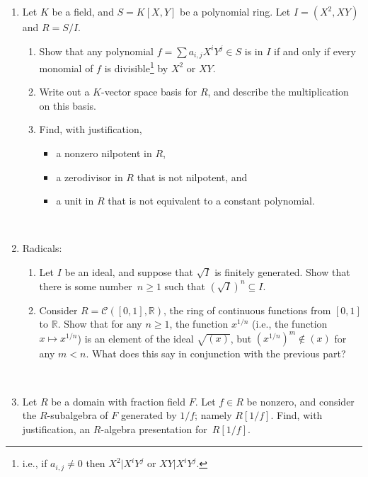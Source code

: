 \documentclass[12pt]{amsart}
\newcommand{\R}{\mathbb{R}}
\begin{document}
	
\begin{enumerate}
\item Let $K$ be a field, and $S=K[X,Y]$ be a polynomial ring. Let $I=(X^2,XY)$ and $R=S/I$.
\begin{enumerate}
\item Show that any polynomial $f=\sum a_{i,j} X^i Y^j \in S$ is in $I$ if and only if every monomial of $f$ is divisible\footnote{i.e., if $a_{i,j}\neq 0$ then $X^2 | X^i Y^j$ or $XY | X^i Y^j$.}
 by $X^2$ or $XY$.
\item Write out a $K$-vector space basis for $R$, and describe the multiplication on this basis.
\item Find, with justification,
\begin{itemize}
\item a nonzero nilpotent in $R$,
\item a zerodivisor in $R$ that is not nilpotent, and
\item a unit in $R$ that is not equivalent to a constant polynomial.
\end{itemize}
\end{enumerate}


\


\item Radicals:
\begin{enumerate}
\item Let $I$ be an ideal, and suppose that $\sqrt{I}$ is finitely generated. Show that there is some number~$n\geq 1$ such that $(\sqrt{I})^n \subseteq I$.
\item Consider $R=\mathcal{C}([0,1],\R)$, the ring of continuous functions from $[0,1]$ to $\R$. Show that for any $n\geq 1$, the function $x^{1/n}$ (i.e., the function $x\mapsto x^{1/n}$) is an element of the ideal $\sqrt{(x)}$, but $(x^{1/n})^m \notin (x)$ for any $m<n$. What does this say in conjunction with the previous part?
\end{enumerate}

\


\item Let $R$ be a domain with fraction field $F$. Let $f\in R$ be nonzero, and consider the $R$-subalgebra of $F$ generated by $1/f$; namely $R[1/f]$. Find, with justification, an $R$-algebra presentation for~$R[1/f]$.


\end{enumerate}
\end{document}
